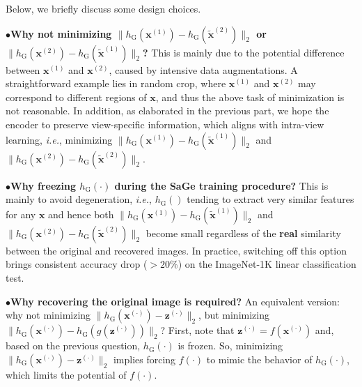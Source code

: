 \documentclass[10pt,twocolumn,letterpaper]{article}
\begin{document}
Below, we briefly discuss some design choices.

\vspace{0.1cm}\noindent
$\bullet$\hspace{0.2cm}\textbf{Why not minimizing $\|h_\mathrm{G}(\mathbf{x}^{(1)})-h_\mathrm{G}(\tilde{\mathbf{x}}^{(2)})\|_2$ or $\|h_\mathrm{G}(\mathbf{x}^{(2)})-h_\mathrm{G}(\tilde{\mathbf{x}}^{(1)})\|_2$?} This is mainly due to the potential difference between $\mathbf{x}^{(1)}$ and $\mathbf{x}^{(2)}$, caused by intensive data augmentations. A straightforward example lies in random crop, where $\mathbf{x}^{(1)}$ and $\mathbf{x}^{(2)}$ may correspond to different regions of $\mathbf{x}$, and thus the above task of minimization is not reasonable. In addition, as elaborated in the previous part, we hope the encoder to preserve view-specific information, which aligns with intra-view learning, \textit{i.e.}, minimizing $\|h_\mathrm{G}(\mathbf{x}^{(1)})-h_\mathrm{G}(\tilde{\mathbf{x}}^{(1)})\|_2$ and $\|h_\mathrm{G}(\mathbf{x}^{(2)})-h_\mathrm{G}(\tilde{\mathbf{x}}^{(2)})\|_2$.

\vspace{0.1cm}\noindent
$\bullet$\hspace{0.2cm}\textbf{Why freezing $h_\mathrm{G}(\cdot)$ during the SaGe training procedure?} This is mainly to avoid degeneration, \textit{i.e.}, $h_\mathrm{G}()$ tending to extract very similar features for any $\mathbf{x}$ and hence both $\|h_\mathrm{G}(\mathbf{x}^{(1)})-h_\mathrm{G}(\tilde{\mathbf{x}}^{(1)})\|_2$ and $\|h_\mathrm{G}(\mathbf{x}^{(2)})-h_\mathrm{G}(\tilde{\mathbf{x}}^{(2)})\|_2$ become small regardless of the \textbf{real} similarity between the original and recovered images. In practice, switching off this option brings consistent accuracy drop ($>20\%$) on the ImageNet-1K linear classification test.

\vspace{0.1cm}\noindent
$\bullet$\hspace{0.2cm}\textbf{Why recovering the original image is required?} An equivalent version: why not minimizing $\|h_\mathrm{G}(\mathbf{x}^{(\cdot)})-\mathbf{z}^{(\cdot)}\|_2$, but minimizing $\|h_\mathrm{G}(\mathbf{x}^{(\cdot)})-h_\mathrm{G}(g(\mathbf{z}^{(\cdot)}))\|_2$? First, note that $\mathbf{z}^{(\cdot)}=f(\mathbf{x}^{(\cdot)})$ and,
based on the previous question, $h_\mathrm{G}(\cdot)$ is frozen. So, minimizing $\|h_\mathrm{G}(\mathbf{x}^{(\cdot)})-\mathbf{z}^{(\cdot)}\|_2$ implies forcing $f(\cdot)$ to mimic the behavior of $h_\mathrm{G}(\cdot)$, which limits the potential of $f(\cdot)$. 
\end{document}
